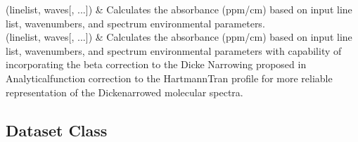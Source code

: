\documentclass[letterpaper,10pt,english]{sphinxmanual}
\begin{document}
\begin{savenotes}\sphinxattablestart
\sphinxthistablewithglobalstyle
\sphinxthistablewithnovlinesstyle
\centering
\begin{tabulary}{\linewidth}[t]{}
\sphinxtoprule
\sphinxtableatstartofbodyhook
\sphinxAtStartPar
{\hyperref[\detokenize{MATS:MATS.fit_dataset.HTP_from_DF_select}]{}}(linelist, waves{[}, ...{]})
&
\sphinxAtStartPar
Calculates the absorbance (ppm/cm) based on input line list, wavenumbers, and spectrum environmental parameters.
\\
\sphinxhline
\sphinxAtStartPar
{\hyperref[\detokenize{MATS:MATS.fit_dataset.HTP_wBeta_from_DF_select}]{}}(linelist, waves{[}, ...{]})
&
\sphinxAtStartPar
Calculates the absorbance (ppm/cm) based on input line list, wavenumbers, and spectrum environmental parameters with capability of incorporating the beta correction to the Dicke Narrowing proposed in Analytical\sphinxhyphen{}function correction to the Hartmann\textendash{}Tran profile for more reliable representation of the Dicke\sphinxhyphen{}narrowed molecular spectra.
\\
\sphinxbottomrule
\end{tabulary}
\sphinxtableafterendhook\par
\sphinxattableend\end{savenotes}


\subsection{Dataset Class}
\label{\detokenize{MATS Summary:dataset-class}}
\end{document}
